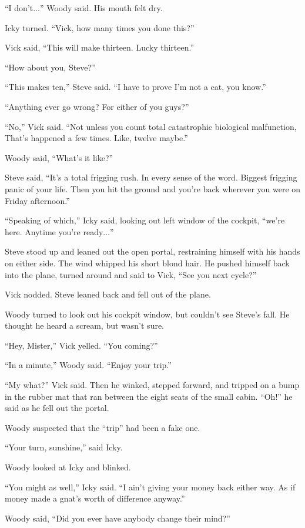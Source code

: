 ``I don't$\ldots$'' Woody said. His mouth felt dry.

Icky turned. ``Vick, how many times you done this?''

Vick said, ``This will make thirteen. Lucky thirteen.''

``How about you, Steve?''

``This makes ten,'' Steve said. ``I have to prove I'm not a cat, you know.''

``Anything ever go wrong? For either of you guys?''

``No,'' Vick said. ``Not unless you count total catastrophic biological malfunction, That's happened a few times. Like, twelve maybe.''

Woody said, ``What's it like?''

Steve said, ``It's a total frigging rush. In every sense of the word. Biggest frigging panic of your life. Then you hit the ground and you're back wherever you were on Friday afternoon.''

``Speaking of which,'' Icky said, looking out left window of the cockpit, ``we're here. Anytime you're ready$\ldots$''

Steve stood up and leaned out the open portal, restraining himself with his hands on either side. The wind whipped his short blond hair. He pushed himself back into the plane, turned around and said to Vick, ``See you next cycle?''

Vick nodded. Steve leaned back and fell out of the plane.

Woody turned to look out his cockpit window, but couldn't see Steve's fall. He thought he heard a scream, but wasn't sure.

``Hey, Mister,'' Vick yelled. ``You coming?''

``In a minute,'' Woody said. ``Enjoy your trip.''

``My what?'' Vick said. Then he winked, stepped forward, and tripped on a bump in the rubber mat that ran between the eight seats of the small cabin. ``Oh!'' he said as he fell out the portal.

Woody suspected that the ``trip'' had been a fake one.

``Your turn, sunshine,'' said Icky.

Woody looked at Icky and blinked.

``You might as well,'' Icky said. ``I ain't giving your money back either way. As if money made a gnat's worth of difference anyway.''

Woody said, ``Did you ever have anybody change their mind?''

